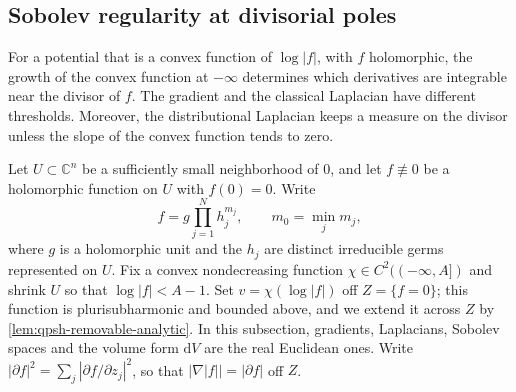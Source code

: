 \subsection{Sobolev regularity at divisorial poles}
\label{subsec:divisorial-sobolev}

For a potential that is a convex function of $\log|f|$, with $f$ holomorphic, the growth of the convex function at $-\infty$ determines which derivatives are integrable near the divisor of $f$. The gradient and the classical Laplacian have different thresholds. Moreover, the distributional Laplacian keeps a measure on the divisor unless the slope of the convex function tends to zero.

Let $U\subset\mathbb C^n$ be a sufficiently small neighborhood of $0$, and let $f\not\equiv0$ be a holomorphic function on $U$ with $f(0)=0$. Write
\[
 f=g\prod_{j=1}^N h_j^{m_j},\qquad
 m_0=\min_jm_j,
\]
where $g$ is a holomorphic unit and the $h_j$ are distinct irreducible germs represented on $U$. Fix a convex nondecreasing function $\chi\in C^2(({-\infty},A])$ and shrink $U$ so that $\log|f|<A-1$. Set $v=\chi(\log|f|)$ off $Z=\{f=0\}$; this function is plurisubharmonic and bounded above, and we extend it across $Z$ by \cref{lem:qpsh-removable-analytic}. In this subsection, gradients, Laplacians, Sobolev spaces and the volume form $\mathrm dV$ are the real Euclidean ones. Write $|\partial f|^2=\sum_j|\partial f/\partial z_j|^2$, so that $|\nabla|f||=|\partial f|$ off $Z$.

